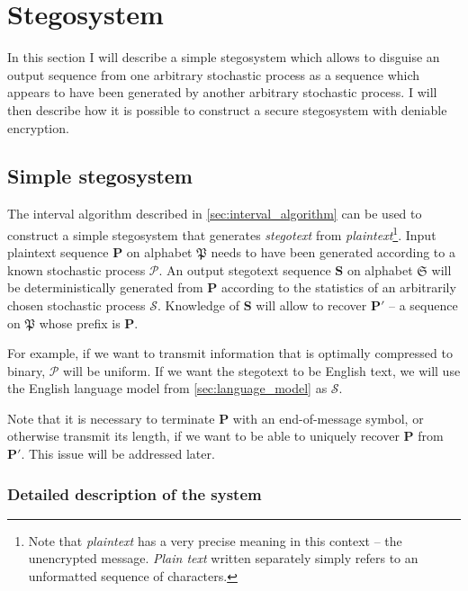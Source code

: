 \documentclass[draft]{IIBproject}
\makeatletter
\DeclareRobustCommand*{\AbbreviationWithDot}[1]{\@ifnextchar{.}{#1}{#1.\@\xspace}}
\DeclareRobustCommand*{\iid}{\AbbreviationWithDot{i.i.d}}
\makeatother
\begin{document}
\clearpage
\section{Stegosystem}
\label{sec:stegosystem}

In this section I will describe a simple stegosystem which allows to disguise an output sequence from one arbitrary stochastic process as a sequence which appears to have been generated by another arbitrary stochastic process. I will then describe how it is possible to construct a secure stegosystem with deniable encryption.

\FloatBarrier
\subsection{Simple stegosystem}
\label{sec:simple_stegosystem}

The interval algorithm described in \cref{sec:interval_algorithm} can be used to construct a simple stegosystem that generates \emph{stegotext} from \emph{plaintext}\footnote{Note that \emph{plaintext} has a very precise meaning in this context -- the unencrypted message. \emph{Plain text} written separately simply refers to an unformatted sequence of characters.}. Input plaintext sequence $\mathbf P$ on alphabet $\mathfrak P$ needs to have been generated according to a known stochastic process $\mathcal P$. An output stegotext sequence $\mathbf S$ on alphabet $\mathfrak S$ will be deterministically generated from $\mathbf P$ according to the statistics of an arbitrarily chosen stochastic process $\mathcal S$. Knowledge of $\mathbf S$ will allow to recover $\mathbf{P'}$ -- a sequence on $\mathfrak P$ whose prefix is $\mathbf P$.

For example, if we want to transmit information that is optimally compressed to binary, $\mathcal P$ will be \iid uniform. If we want the stegotext to be English text, we will use the English language model from \cref{sec:language_model} as $\mathcal S$.

Note that it is necessary to terminate $\mathbf P$ with an end-of-message symbol, or otherwise transmit its length, if we want to be able to uniquely recover $\mathbf P$ from $\mathbf{P'}$. This issue will be addressed later.

\subsubsection{Detailed description of the system}
\end{document}
